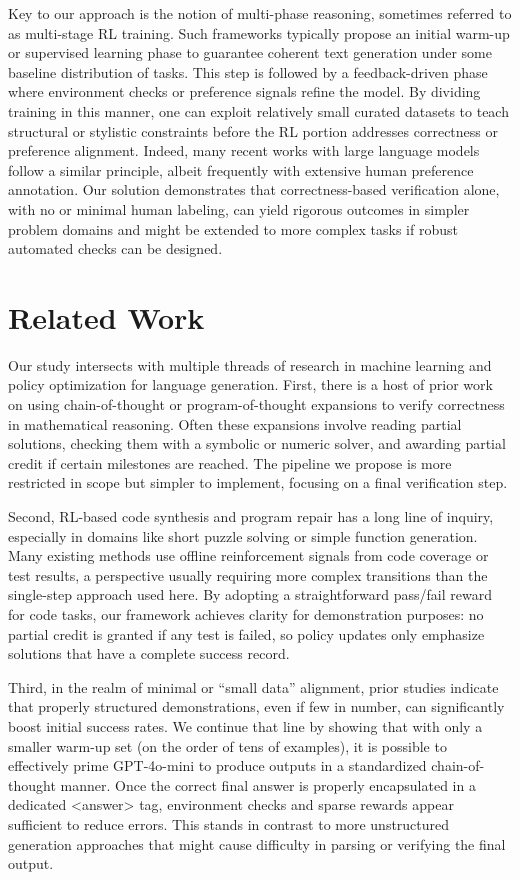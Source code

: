 \documentclass{article}
\begin{document}
Key to our approach is the notion of multi-phase reasoning, sometimes referred to as multi-stage RL training. Such frameworks typically propose an initial warm-up or supervised learning phase to guarantee coherent text generation under some baseline distribution of tasks. This step is followed by a feedback-driven phase where environment checks or preference signals refine the model. By dividing training in this manner, one can exploit relatively small curated datasets to teach structural or stylistic constraints before the RL portion addresses correctness or preference alignment. Indeed, many recent works with large language models follow a similar principle, albeit frequently with extensive human preference annotation. Our solution demonstrates that correctness-based verification alone, with no or minimal human labeling, can yield rigorous outcomes in simpler problem domains and might be extended to more complex tasks if robust automated checks can be designed.

\section{Related Work}
Our study intersects with multiple threads of research in machine learning and policy optimization for language generation. First, there is a host of prior work on using chain-of-thought or program-of-thought expansions to verify correctness in mathematical reasoning. Often these expansions involve reading partial solutions, checking them with a symbolic or numeric solver, and awarding partial credit if certain milestones are reached. The pipeline we propose is more restricted in scope but simpler to implement, focusing on a final verification step.

Second, RL-based code synthesis and program repair has a long line of inquiry, especially in domains like short puzzle solving or simple function generation. Many existing methods use offline reinforcement signals from code coverage or test results, a perspective usually requiring more complex transitions than the single-step approach used here. By adopting a straightforward pass/fail reward for code tasks, our framework achieves clarity for demonstration purposes: no partial credit is granted if any test is failed, so policy updates only emphasize solutions that have a complete success record.

Third, in the realm of minimal or “small data” alignment, prior studies indicate that properly structured demonstrations, even if few in number, can significantly boost initial success rates. We continue that line by showing that with only a smaller warm-up set (on the order of tens of examples), it is possible to effectively prime GPT-4o-mini to produce outputs in a standardized chain-of-thought manner. Once the correct final answer is properly encapsulated in a dedicated <answer> tag, environment checks and sparse rewards appear sufficient to reduce errors. This stands in contrast to more unstructured generation approaches that might cause difficulty in parsing or verifying the final output.
\end{document}
